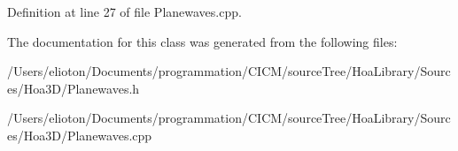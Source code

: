 Definition at line 27 of file Planewaves.\-cpp.



The documentation for this class was generated from the following files\-:\begin{DoxyCompactItemize}
\item 
/\-Users/elioton/\-Documents/programmation/\-C\-I\-C\-M/source\-Tree/\-Hoa\-Library/\-Sources/\-Hoa3\-D/Planewaves.\-h\item 
/\-Users/elioton/\-Documents/programmation/\-C\-I\-C\-M/source\-Tree/\-Hoa\-Library/\-Sources/\-Hoa3\-D/Planewaves.\-cpp\end{DoxyCompactItemize}
